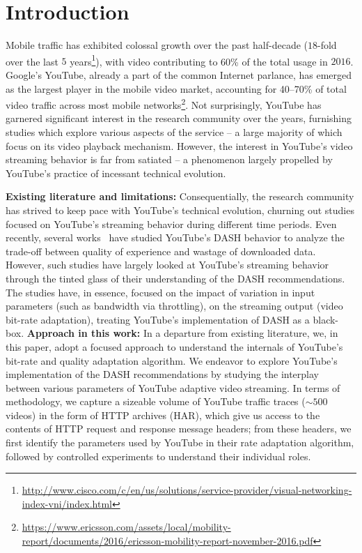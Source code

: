 \section{Introduction}
\label{chap03sec:introduction}

Mobile traffic has exhibited colossal growth over the past half-decade ($18$-fold over the last $5$ years\footnote{\url{http://www.cisco.com/c/en/us/solutions/service-provider/visual-networking-index-vni/index.html}}), with video contributing to 60\% of the total usage in $2016$. 
Google's YouTube, already a part of the common Internet parlance, has emerged as the largest player in the mobile video market, accounting for 40--70\% of total video traffic across most mobile networks\footnote{\url{https://www.ericsson.com/assets/local/mobility-report/documents/2016/ericsson-mobility-report-november-2016.pdf}}.
Not surprisingly, YouTube has garnered significant interest in the research community over the years, furnishing studies which explore various aspects of the service -- a large majority of which focus on its video playback mechanism.
However, the interest in YouTube's video streaming behavior is far from satiated -- a phenomenon largely propelled by YouTube's practice of incessant technical evolution. %

{\bf Existing literature and limitations:} Consequentially, the research community has strived to keep pace with YouTube's technical evolution, churning out studies focused on YouTube's streaming behavior during different time periods.
Even recently, several works~\cite{sieber2015cost,seufert2015youtube,sieber2016sacrificing} have studied YouTube's DASH behavior to analyze the trade-off between quality of experience and wastage of downloaded data.
However, such studies have largely looked at YouTube's streaming behavior through the tinted glass of their understanding of the DASH recommendations.
The studies have, in essence, focused on the impact of variation in input parameters (such as bandwidth via throttling), on the streaming output (video bit-rate adaptation), treating YouTube's implementation of DASH as a black-box.
{\bf Approach in this work:} In a departure from existing literature, we, in this paper, adopt a focused approach to understand the internals of YouTube's bit-rate and quality adaptation algorithm.
We endeavor to explore YouTube's implementation of the DASH recommendations by studying the interplay between various parameters of YouTube adaptive video streaming.
In terms of methodology, we capture a sizeable volume of YouTube traffic traces ($\sim500$ videos) in the form of HTTP archives (HAR), which give us access to the contents of HTTP request and response message headers;
from these headers, we first identify the parameters used by YouTube in their rate adaptation algorithm, followed by controlled experiments to understand their individual roles.

